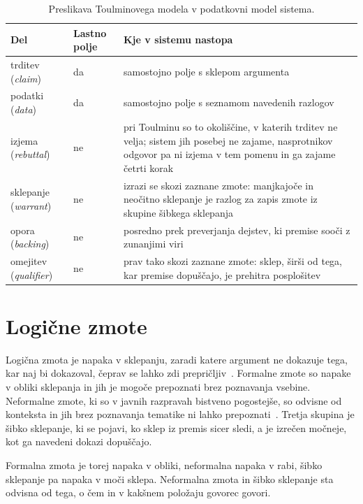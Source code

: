 \documentclass[a4paper, 12pt]{book}
\begin{document}
\begin{table}[H]
\centering
\small
{}
\begin{tabular}{@{}p{}p{}p{}@{}}
\toprule
\textbf{Del} & \textbf{Lastno polje} & \textbf{Kje v sistemu nastopa} \\
\midrule
trditev (\textit{claim}) & da & samostojno polje s sklepom argumenta \\
\midrule
podatki (\textit{data}) & da & samostojno polje s seznamom navedenih razlogov \\
\midrule
izjema (\textit{rebuttal}) & ne & pri Toulminu so to okoliščine, v katerih
trditev ne velja; sistem jih posebej ne zajame, nasprotnikov odgovor pa ni izjema v
tem pomenu in ga zajame četrti korak \\
\midrule
sklepanje (\textit{warrant}) & ne & izrazi se skozi zaznane zmote: manjkajoče
in neočitno sklepanje je razlog za zapis zmote iz skupine šibkega sklepanja \\
\midrule
opora (\textit{backing}) & ne & posredno prek preverjanja dejstev, ki premise
sooči z zunanjimi viri \\
\midrule
omejitev (\textit{qualifier}) & ne & prav tako skozi zaznane zmote: sklep,
širši od tega, kar premise dopuščajo, je prehitra posplošitev \\
\bottomrule
\end{tabular}
\caption{Preslikava Toulminovega modela v podatkovni model sistema.}
\label{tbl:toulmin}
\end{table}


\section{Logične zmote}
\label{sec:zmote}
Logična zmota je napaka v sklepanju, zaradi katere argument ne dokazuje tega,
kar naj bi dokazoval, čeprav se lahko zdi prepričljiv~\cite{copi2014}. Formalne
zmote so napake v obliki sklepanja in jih je mogoče prepoznati brez poznavanja
vsebine. Neformalne zmote, ki so v javnih razpravah bistveno pogostejše, so
odvisne od konteksta in jih brez poznavanja tematike ni lahko
prepoznati~\cite{walton2008}. Tretja skupina je šibko sklepanje, ki se pojavi,
ko sklep iz premis sicer sledi, a je izrečen močneje, kot ga navedeni dokazi
dopuščajo.

Formalna zmota je torej napaka v obliki, neformalna napaka v rabi, šibko
sklepanje pa napaka v moči sklepa. Neformalna zmota in šibko sklepanje sta
odvisna od tega, o čem in v kakšnem položaju govorec govori. 
\end{document}
